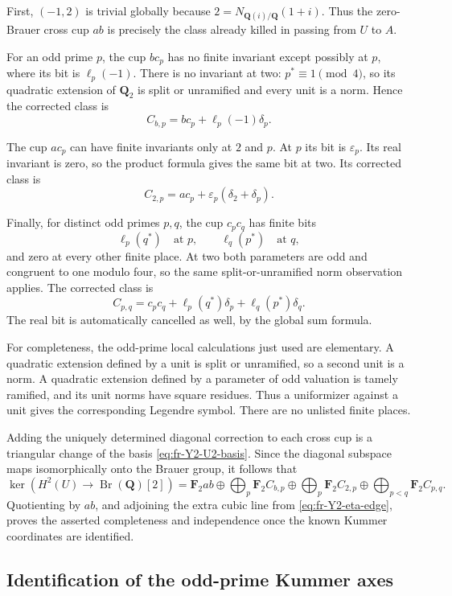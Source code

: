 First, \((-1,2)\) is trivial globally because
\(2=N_{\mathbf Q(i)/\mathbf Q}(1+i)\).
Thus the zero-Brauer cross cup \(ab\) is precisely the class
already killed in passing from \(U\) to \(A\).

For an odd prime \(p\), the cup \(bc_p\) has no finite
invariant except possibly at \(p\), where its bit is
\(\ell_p(-1)\). There is no invariant at two:
\(p^*\equiv1\pmod4\), so its quadratic extension of
\(\mathbf Q_2\) is split or unramified and every unit is a norm.
Hence the corrected class is
\[
 C_{b,p}=bc_p+\ell_p(-1)\delta_p.
\]

The cup \(ac_p\) can have finite invariants only at \(2\) and \(p\).
At \(p\) its bit is \(\varepsilon_p\).
Its real invariant is zero, so the product formula gives
the same bit at two. Its corrected class is
\[
 C_{2,p}=ac_p+\varepsilon_p(\delta_2+\delta_p).
\]

Finally, for distinct odd primes \(p,q\), the cup \(c_pc_q\)
has finite bits
\[
 \ell_p(q^*)\quad\text{at }p,\qquad
 \ell_q(p^*)\quad\text{at }q,
\]
and zero at every other finite place. At two both parameters
are odd and congruent to one modulo four, so the same
split-or-unramified norm observation applies.
The corrected class is
\[
 C_{p,q}=c_pc_q+\ell_p(q^*)\delta_p+\ell_q(p^*)\delta_q.
\]
The real bit is automatically cancelled as well, by the
global sum formula.

For completeness, the odd-prime local calculations just used
are elementary. A quadratic extension defined by a unit is
split or unramified, so a second unit is a norm. A quadratic
extension defined by a parameter of odd valuation is tamely
ramified, and its unit norms have square residues. Thus a
uniformizer against a unit gives the corresponding Legendre
symbol. There are no unlisted finite places.

Adding the uniquely determined diagonal correction to each
cross cup is a triangular change of the basis
\eqref{eq:fr-Y2-U2-basis}. Since the diagonal subspace maps
isomorphically onto the Brauer group, it follows that
\[
 \ker\!\left(H^2(U)\longrightarrow\operatorname{Br}(\mathbf Q)[2]\right)
 =
 \mathbf F_2ab
 \oplus\bigoplus_p\mathbf F_2 C_{b,p}
 \oplus\bigoplus_p\mathbf F_2 C_{2,p}
 \oplus\bigoplus_{p<q}\mathbf F_2 C_{p,q}.
\]
Quotienting by \(ab\), and adjoining the extra cubic line
from \eqref{eq:fr-Y2-eta-edge}, proves the asserted completeness
and independence once the known Kummer coordinates are identified.

\subsection{Identification of the odd-prime Kummer axes}

